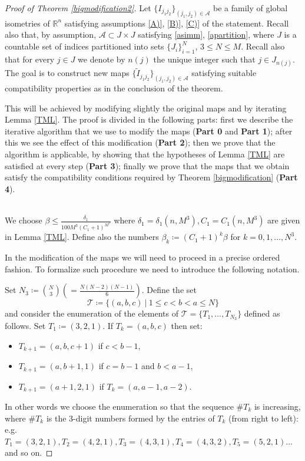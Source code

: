 \documentclass[11pt]{article}
\newcommand{\rr}{\mathbb{R}}
\theoremstyle{plain}
\theoremstyle{definition}
\numberwithin{equation}{section}
\begin{document}
\begin{proof}[Proof of Theorem \ref{bigmodification2}]
  Let $\{I_{j_1j_2}\}_{(j_1,j_2)\in \mathcal{A}}$ be a family of global isometries of $\rr^n$ satisfying assumptions \ref{A)}, \ref{B)}, \ref{C)} of the statement. Recall also that, by assumption, $\mathcal A\subset J\times J$ satisfying \eqref{asimm}, \eqref{apartition}, where  $J$ is a countable set of indices partitioned into sets  $\{J_{i}\}_{i=1}^N$, $3\le N\le M$. Recall also that for every $j \in J$ we denote by $n(j)$  the unique integer such that $j\in J_{n(j)}.$
The goal is to construct  new maps $\{\widetilde I_{j_1j_2}\}_{(j_1,j_2)\in \mathcal{A}}$ satisfying suitable compatibility properties as in the conclusion of the theorem.

	This will be achieved by modifying slightly the original maps and by iterating Lemma \ref{TML}. 
	The proof is divided in the following parts: first we describe the iterative algorithm that we use to modify the maps  (\textbf{Part 0} and \textbf{Part 1}); after this we see the effect of this modification  (\textbf{Part 2});  then we prove that the algorithm is applicable, by showing that the hypotheses of Lemma \ref{TML} are satisfied at every step  (\textbf{Part 3}); finally we prove that the maps that we obtain satisfy the compatibility conditions required by Theorem \ref{bigmodification}  (\textbf{Part 4}).

	\medskip
	
\\
	We choose $\beta \le \frac{\delta_1}{100M^3(C_1+1)^{M^3}}$ where  $\delta_1=\delta_1(n,M^3),C_1=C_1(n,M^3)$ are given in Lemma \ref{TML}. Define also the numbers $\beta_k\coloneqq (C_1+1)^k\beta$ for $k=0,1,\dots,N^3$.
	
	In the modification of the maps we will need to proceed in a precise  ordered fashion. To formalize such procedure we need to introduce the following notation.
	 
	Set $N_3\coloneqq \binom{N}{3} (=\frac{N(N-2)(N-1)}{6})$. Define the set $$\mathscr{T}\coloneqq \{(a,b,c) \ | \ 1\le c<b<a\le N\} $$ and consider the enumeration of the elements of $\mathscr{T}=\{T_1,...,T_{N_3}\}$ defined as follows. Set $T_1\coloneqq (3,2,1)$. If $T_k=(a,b,c)$ then set:
	\begin{itemize}
		\item $T_{k+1}=(a,b,c+1)$ if $c<b-1$,
		\item $T_{k+1}=(a,b+1,1)$ if $c=b-1$ and $b<a-1$,
		\item $T_{k+1}=(a+1,2,1)$ if $T_k=(a,a-1,a-2).$
	\end{itemize}  
	In other words we choose the enumeration so that the sequence $\#T_k$ is increasing, where $\#T_k$ is the 3-digit numbers formed by the  entries of $T_k$ (from right to left): e.g.\  $T_1=(3,2,1), T_2=(4,2,1),T_3=(4,3,1), T_4=(4,3,2), T_5=(5,2,1)...$ and so on.
	

\end{proof}
\end{document}
